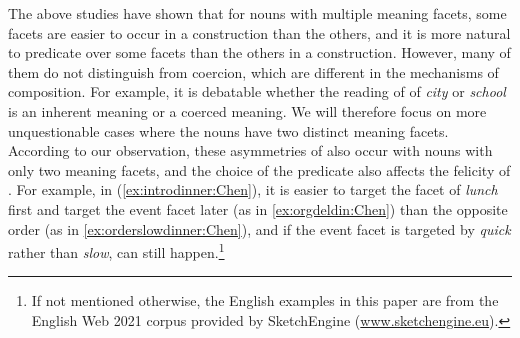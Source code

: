 \documentclass[output=paper,colorlinks,citecolor=brown,chinesefont]{langscibook}
\begin{document}

The above studies have shown that for nouns with multiple meaning facets, some facets are easier to occur in a  construction than the others, and it is more natural to predicate over some facets than the others in a  construction. However, many of them do not distinguish  from coercion, which are different in the mechanisms of composition. For example, it is debatable whether the reading of  of \emph{city} or \emph{school} is an inherent meaning or a coerced meaning. We will therefore focus on more unquestionable cases where the nouns have two distinct meaning facets. According to our observation, these asymmetries of  also occur with nouns with only two meaning facets, and the choice of the predicate also affects the felicity of .
For example, in (\ref{ex:introdinner:Chen}), it is easier to target the  facet of \emph{lunch} first and target the event facet later (as in \ref{ex:orgdeldin:Chen}) than the opposite order (as in \ref{ex:orderslowdinner:Chen}), and if the event facet is targeted by \emph{quick} rather than \emph{slow},  can still happen.\footnote{If not mentioned otherwise, the English examples in this paper are from the English Web 2021 corpus \citep[enTenTen21; see][]{jakubivcek2013tenten} provided by SketchEngine (\url{www.sketchengine.eu}).}
\end{document}

